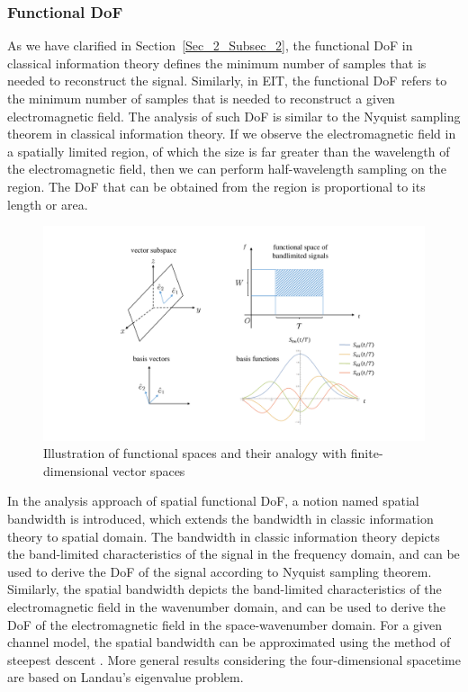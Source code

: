 \documentclass[journal,twocolumn]{IEEEtran}
\begin{document}
\subsubsection{Functional DoF}
As we have clarified in Section~\ref{Sec_2_Subsec_2}, the functional DoF in classical information theory defines the minimum number of samples that is needed to reconstruct the signal. Similarly, in EIT, the functional DoF refers to the minimum number of samples that is needed to reconstruct a given electromagnetic field. The analysis of such DoF is similar to the Nyquist sampling theorem in classical information theory. If we observe the electromagnetic field in a spatially limited region, of which the size is far greater than the wavelength of the electromagnetic field, then we can perform half-wavelength sampling on the region. The DoF that can be obtained from the region is proportional to its length or area. 

\begin{figure}
	\centering 
	\includegraphics[width=\linewidth]{figures/PSWF.pdf} 
	\caption{Illustration of functional spaces and their analogy with finite-dimensional vector spaces }
	\label{fig:CAPMIMO}
\end{figure}

In the analysis approach of spatial functional DoF, a notion named spatial bandwidth is introduced, which extends the bandwidth in classic information theory to spatial domain. The bandwidth in classic information theory depicts the band-limited characteristics of the signal in the frequency domain, and can be used to derive the DoF of the signal according to Nyquist sampling theorem. Similarly, the spatial bandwidth depicts the band-limited characteristics of the electromagnetic field in the wavenumber domain, and can be used to derive the DoF of the electromagnetic field in the space-wavenumber domain. For a given channel model, the spatial bandwidth can be approximated using the method of steepest descent \cite{bucci1987spatial}. More general results considering the four-dimensional spacetime are based on Landau's eigenvalue problem.
\end{document}
